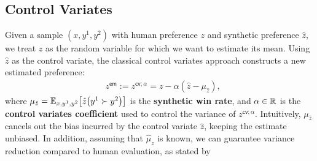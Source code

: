 \subsection{Control Variates}
\label{sec:method_motiv}
Given a sample $(x,y^1, y^2)$ with human preference $z$ and synthetic preference $\hat z$, we treat $z$ as the random variable for which we want to estimate its mean. Using $\hat z$ as the control variate, the classical control variates  approach \citep{lavenberg1981perspective} constructs a new estimated preference:
\begin{align}
    & z^{\mathsf{em}} := z^{\mathsf{cv}; \alpha} = z - \alpha (\hat z - \mu_{\hat z}), 
    \label{eq:cv}
\end{align}
where 
$
\mu_{\hat z} = \E_{x, y^1, y^2}\brk*{\hat z\prn*{y^1 \succ y^2}}
$
is the \textbf{synthetic win rate}, and 
$\alpha \in \mathbb{R}$ is the \textbf{control variates coefficient} used to control the variance of $z^{\mathsf{cv}; \alpha}$. Intuitively, $\mu_{\hat z}$ cancels out the bias incurred by the control variate $\hat z$, keeping the estimate unbiased. In addition, assuming that $\hat \mu_z$ is known, we can guarantee variance reduction compared to human evaluation, as stated by
